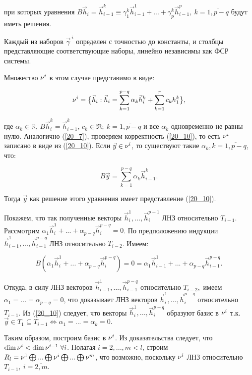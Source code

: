 при которых уравнения $B\vec{h}_i = \vec{h}_{i-1}^k \equiv \gamma_1^k \vec{h}_{i-1}^1 + ... + \gamma_p^k \vec{h}_{i-1}^p, \: k = \overline{1, p-q}$ будут иметь решения.

Каждый из наборов $\vec{\gamma}^{\: i}$ определен с точностью до константы, и столбцы представляющие соответствующие наборы, линейно независимы как ФСР системы.

Множество $\nu^i$ в этом случае представимо в виде:

\begin{equation}\label{20_10}
	\nu^i = \big\lbrace \vec{h}_i: \vec{h}_i = \sum\limits_{k=1}^{p-q}\alpha_k \vec{h}_i^k + \sum\limits_{k=1}^r c_k h_1^k \big\rbrace,
\end{equation}

где $\alpha_k \in  \mathbb{R}$, $B \vec{h}_i^k = \vec{h}_{i-1}^k$, $c_k \in \Re; \: k = \overline{1, p-q}$ и все $\alpha_k$ одновременно не равны нулю. Аналогично (\ref{20_7}), проверяем корректность (\ref{20_10}), то есть $\nu^i$ записано в виде из (\ref{20_10}). Если $\vec{y} \in \nu^i$, то существуют такие $\alpha_k, k = \overline{1, p-q}$, что:

\[B \vec{y} = \sum\limits_{k=1}^{p-q} \alpha_k \vec{h}_{i-1}^k.\]

Тогда $\vec{y}$ как решение этого уравнения имеет представление (\ref{20_10}).

Покажем, что так полученные векторы $\vec{h}_i^1, ... , \vec{h}_i^{p-1}$ ЛНЗ относительно $T_{i-1}$. Рассмотрим $\alpha_1 \vec{h}_i^1 + ... + \alpha_{p-q} \vec{h}_i^{p-q} = 0$. По предположению индукции $\vec{h}_{i-1}^1, ... , \vec{h}_{i-1}^{p-q}$ ЛНЗ относительно $T_{i-2}$. Имеем:

\[B(\alpha_1 \vec{h}_i^1 + ... + \alpha_{p-q}\vec{h}_i^{p-q}) = 0 = \alpha_1 \vec{h}_{i-1}^1 + ... + \alpha_{p-q} \vec{h}_{i-1}^{p-q}.\]

Откуда, в силу ЛНЗ векторов $\vec{h}_{i-1}^1, ... ,\vec{h}_{i-1}^{p-q}$ относительно $T_{i-2},$ имеем $\alpha_1 = ... = \alpha_{p-q} = 0$, что доказывает ЛНЗ векторов $\vec{h}_i^1, ... , \vec{h}_i^{p-q}$ относительно $T_{i-1}$. Из (\ref{20_10}) следует, что векторы $\vec{h}_i^1, ... , \vec{h}_i^{p-q}$ образуют базис в $\nu^i$ т.к. $\vec{y} \in T_1\subseteq T_{i-1} \Leftrightarrow \alpha_1 = ... = \alpha_k = 0.$

Таким образом, построим базис в $\nu^i$. Из доказательства следует, что $\dim \nu^i < \dim \nu^{i-1} \; \forall i$. Полагая $i = 2, ... ,m < l$, строим $R_l = \nu^1 \bigoplus ... \bigoplus \nu^i \bigoplus ... \bigoplus \nu^m$, что возможно, поскольку $\nu^i$ ЛНЗ относительно $T_{i-1}, \: i = \overline{2,m}$.
